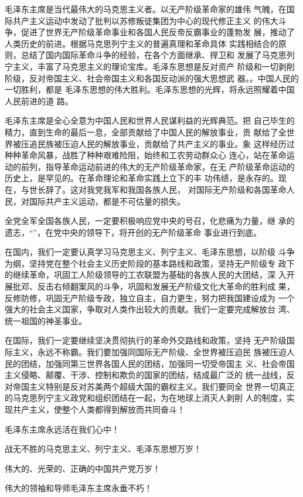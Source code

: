 \begin{hongqiarticle}
  毛泽东主席是当代最伟大的马克思主义者。以无产阶级革命家的雄伟
  气魄，在国际共产主义运动中发动了批判以苏修叛徒集团为中心的现代修正主义
  的伟大斗争，促进了世界无产阶级革命事业和各国人民反帝反霸事业的蓬勃发
  展，推动了人类历史的前进。根据马克思列宁主义的普遍真理和革命具体
  实践相结合的原则，总结了国内国际革命斗争的经验，在各个方面继承、捍卫和
  发展了马克思列宁主义，丰富了马克思主义的理论宝库。毛泽东思想是反对资产
  阶级和一切剥削阶级，反对帝国主义、社会帝国主义和各国反动派的强大思想武
  器。。中国人民的一切胜利，都是
  毛泽东思想的伟大胜利。毛泽东思想的光辉，将永远照耀着中国人民前进的道
  路。

  毛泽东主席是全心全意为中国人民和世界人民谋利益的光辉典范。把
  自己毕生的精力，直到生命的最后一息，全部贡献给了中国人民的解放事业，贡
  献给了全世界被压追民族被压迫人民的解放事业，贡献给了共产主义的事业。象
  这样经历过种种革命风暴，战胜了种种艰难险阻，始终和工农劳动群众心
  连心，站在革命运动的前列，指导革命运动前进的伟大的无产阶级革命家，在无
  产阶级革命运动的历史上，是罕见的。在革命理论和革命实践上立下的丰
  功伟绩，是永存的。现在，与世长辞了。这对我党我军和我国各族人民，
  对国际无产阶级和各国革命人民，对国际共产主义运动，都是不可估量的损失。

  全党全军全国各族人民，一定要积极响应党中央的号召，化悲痛为力量，继
  承的遗志，“”，在党中央的领导下，将开创的无产阶级革命
  事业进行到底。

  在国内，我们一定要认真学习马克思主义、列宁主义、毛泽东思想，以阶级
  斗争为纲，坚持党在整个社会主义历史阶段的基本路线和政策，坚持无产阶级专
  政下的继续革命，巩固工人阶级领导的工农联盟为基础的各族人民的大团结，深
  入开展批邓、反击右倾翻案风的斗争，巩固和发展无产阶级文化大革命的胜利成
  果，反修防修，巩固无产阶级专政，独立自主，自力更生，努力把我国建设成为
  一个强大的社会主义国家，争取对人类作出较大的贡献。我们一定要完成解放台
  湾、统一祖国的神圣事业。

  在国际，我们一定要继续坚决贯彻执行的革命外交路线和政策，坚持
  无产阶级国际主义，永远不称霸。我们要加强同国际无产阶级、全世界被压迫民
  族被压迫人民的团结，加强同第三世界各国人民的团结，加强同一切受帝国主
  义、社会帝国主义侵略、颠覆、干涉、控制和欺负的国家的团结，结成最广泛的
  统一战线，反对帝国主义特别是反对苏美两个超级大国的霸权主义。我们要同全
  世界一切真正的马克思列宁主义政党和组织团结在一起，为在地球上消灭人剥削
  人的制度，实现共产主义，使整个人类都得到解放而共同奋斗！

  毛泽东主席永远活在我们心中！

  战无不胜的马克思主义、列宁主义、毛泽东思想万岁！

  伟大的、光荣的、正确的中国共产党万岁！

  伟大的领袖和导师毛泽东主席永垂不朽！

\end{hongqiarticle}
